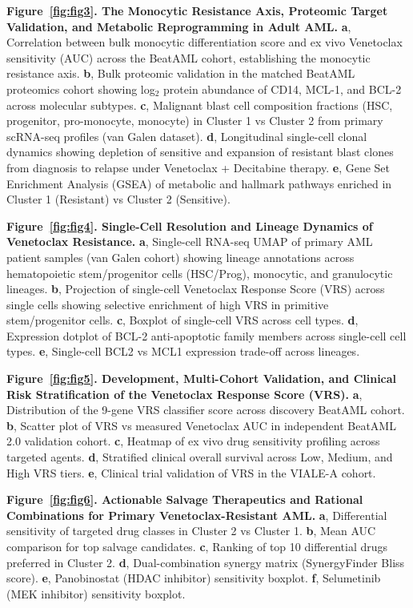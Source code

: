 \documentclass[11pt,a4paper]{article}
\begin{document}
\textbf{Figure~\ref{fig:fig3}. The Monocytic Resistance Axis, Proteomic Target Validation, and Metabolic Reprogramming in Adult AML.} \textbf{a}, Correlation between bulk monocytic differentiation score and ex vivo Venetoclax sensitivity (AUC) across the BeatAML cohort, establishing the monocytic resistance axis. \textbf{b}, Bulk proteomic validation in the matched BeatAML proteomics cohort showing log$_2$ protein abundance of CD14, MCL-1, and BCL-2 across molecular subtypes. \textbf{c}, Malignant blast cell composition fractions (HSC, progenitor, pro-monocyte, monocyte) in Cluster 1 vs Cluster 2 from primary scRNA-seq profiles (van Galen dataset). \textbf{d}, Longitudinal single-cell clonal dynamics showing depletion of sensitive and expansion of resistant blast clones from diagnosis to relapse under Venetoclax + Decitabine therapy. \textbf{e}, Gene Set Enrichment Analysis (GSEA) of metabolic and hallmark pathways enriched in Cluster 1 (Resistant) vs Cluster 2 (Sensitive).

\textbf{Figure~\ref{fig:fig4}. Single-Cell Resolution and Lineage Dynamics of Venetoclax Resistance.} \textbf{a}, Single-cell RNA-seq UMAP of primary AML patient samples (van Galen cohort) showing lineage annotations across hematopoietic stem/progenitor cells (HSC/Prog), monocytic, and granulocytic lineages. \textbf{b}, Projection of single-cell Venetoclax Response Score (VRS) across single cells showing selective enrichment of high VRS in primitive stem/progenitor cells. \textbf{c}, Boxplot of single-cell VRS across cell types. \textbf{d}, Expression dotplot of BCL-2 anti-apoptotic family members across single-cell cell types. \textbf{e}, Single-cell BCL2 vs MCL1 expression trade-off across lineages.

\textbf{Figure~\ref{fig:fig5}. Development, Multi-Cohort Validation, and Clinical Risk Stratification of the Venetoclax Response Score (VRS).} \textbf{a}, Distribution of the 9-gene VRS classifier score across discovery BeatAML cohort. \textbf{b}, Scatter plot of VRS vs measured Venetoclax AUC in independent BeatAML 2.0 validation cohort. \textbf{c}, Heatmap of ex vivo drug sensitivity profiling across targeted agents. \textbf{d}, Stratified clinical overall survival across Low, Medium, and High VRS tiers. \textbf{e}, Clinical trial validation of VRS in the VIALE-A cohort.

\textbf{Figure~\ref{fig:fig6}. Actionable Salvage Therapeutics and Rational Combinations for Primary Venetoclax-Resistant AML.} \textbf{a}, Differential sensitivity of targeted drug classes in Cluster 2 vs Cluster 1. \textbf{b}, Mean AUC comparison for top salvage candidates. \textbf{c}, Ranking of top 10 differential drugs preferred in Cluster 2. \textbf{d}, Dual-combination synergy matrix (SynergyFinder Bliss score). \textbf{e}, Panobinostat (HDAC inhibitor) sensitivity boxplot. \textbf{f}, Selumetinib (MEK inhibitor) sensitivity boxplot.
\end{document}
